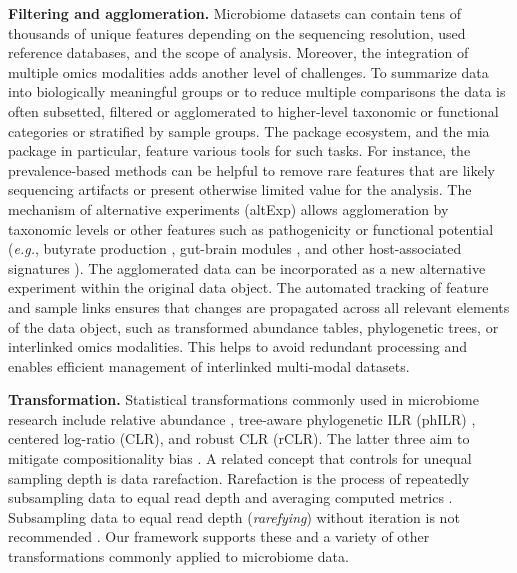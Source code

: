 \documentclass[
  sn-nature,
]{sn-jnl}
\begin{document}
\textbf{Filtering and agglomeration.} Microbiome datasets can contain
tens of thousands of unique features depending on the sequencing
resolution, used reference databases, and the scope of analysis.
Moreover, the integration of multiple omics modalities adds another
level of challenges. To summarize data into biologically meaningful
groups or to reduce multiple comparisons the data is often subsetted,
filtered or agglomerated to higher-level taxonomic or functional
categories or stratified by sample groups. The package ecosystem, and
the mia package in particular, feature various tools for such tasks. For
instance, the prevalence-based methods can be helpful to remove rare
features that are likely sequencing artifacts or present otherwise
limited value for the analysis. The mechanism of alternative experiments
(altExp) allows agglomeration by taxonomic levels or other features such
as pathogenicity or functional potential (\emph{e.g.}, butyrate
production \citep{kullberg2024}, gut-brain modules
\citep{vallescolomer2019}, and other host-associated signatures
\citep{geistlinger2024}). The agglomerated data can be incorporated as a
new alternative experiment within the original data object. The
automated tracking of feature and sample links ensures that changes are
propagated across all relevant elements of the data object, such as
transformed abundance tables, phylogenetic trees, or interlinked omics
modalities. This helps to avoid redundant processing and enables
efficient management of interlinked multi-modal datasets.

\textbf{Transformation.} Statistical transformations commonly used in
microbiome research include relative abundance \citep{gloor2017},
tree-aware phylogenetic ILR (phILR) \citep{silverman2017}, centered
log-ratio (CLR), and robust CLR (rCLR). The latter three aim to mitigate
compositionality bias \citep{martino2019}. A related concept that
controls for unequal sampling depth is data rarefaction. Rarefaction is
the process of repeatedly subsampling data to equal read depth and
averaging computed metrics \citep{schloss2024b}. Subsampling data to
equal read depth (\emph{rarefying}) without iteration is not recommended
\citep{mcmurdie2014, schloss2024, willis2019b}. Our framework supports
these and a variety of other transformations commonly applied to
microbiome data.
\end{document}
